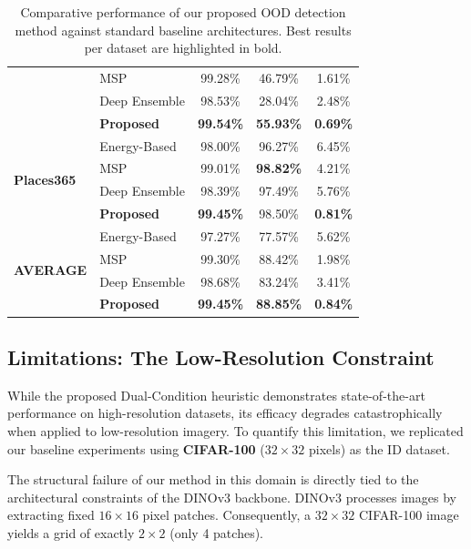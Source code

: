 \documentclass[oneside]{ctuthesis}
\begin{document}
\begin{table}[htbp]
\begin{tabular}{@{}llccc@{}}
        & MSP                & 99.28\% & 46.79\% & 1.61\% \\
        & Deep Ensemble      & 98.53\% & 28.04\% & 2.48\% \\
        & \textbf{Proposed}  & \textbf{99.54\%} & \textbf{55.93\%} & \textbf{0.69\%} \\
        \midrule
        \multirow{4}{*}{\textbf{Places365}} 
        & Energy-Based       & 98.00\% & 96.27\% & 6.45\% \\
        & MSP                & 99.01\% & \textbf{98.82\%} & 4.21\% \\
        & Deep Ensemble      & 98.39\% & 97.49\% & 5.76\% \\
        & \textbf{Proposed}  & \textbf{99.45\%} & 98.50\% & \textbf{0.81\%} \\
        \midrule
        \midrule
        \multirow{4}{*}{\textbf{AVERAGE}} 
        & Energy-Based       & 97.27\% & 77.57\% & 5.62\% \\
        & MSP                & 99.30\% & 88.42\% & 1.98\% \\
        & Deep Ensemble      & 98.68\% & 83.24\% & 3.41\% \\
        & \textbf{Proposed}  & \textbf{99.45\%} & \textbf{88.85\%} & \textbf{0.84\%} \\
        \bottomrule
    \end{tabular}
    \caption{Comparative performance of our proposed OOD detection method against standard baseline architectures. Best results per dataset are highlighted in bold.}
    \label{tab:ood_baseline_comparison}
\end{table}

\subsection{Limitations: The Low-Resolution Constraint}
\label{sec:ood_limitations_resolution}

While the proposed Dual-Condition heuristic demonstrates state-of-the-art performance on high-resolution datasets, its efficacy degrades catastrophically when applied to low-resolution imagery. To quantify this limitation, we replicated our baseline experiments using \textbf{CIFAR-100} ($32 \times 32$ pixels) as the ID dataset. 

The structural failure of our method in this domain is directly tied to the architectural constraints of the DINOv3 backbone. DINOv3 processes images by extracting fixed $16 \times 16$ pixel patches. Consequently, a $32 \times 32$ CIFAR-100 image yields a grid of exactly $2 \times 2$ (only 4 patches). 
\end{document}
